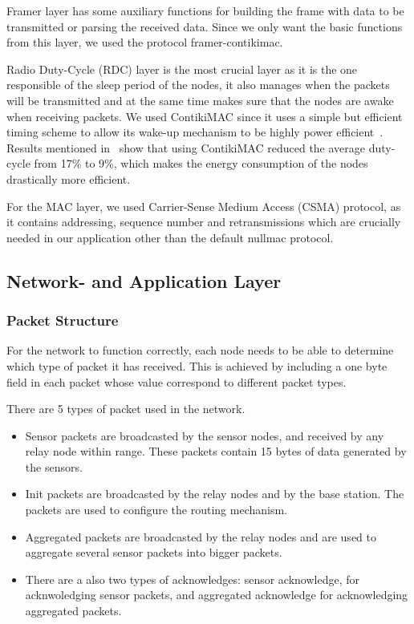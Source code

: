 \documentclass[conference]{IEEEtran}
\begin{document}
Framer layer has some auxiliary functions for building the frame with data to be transmitted or 
parsing the received data. Since we only want the basic functions from this layer, we used the 
protocol framer-contikimac.

Radio Duty-Cycle (RDC) layer is the most crucial layer as it is the one responsible of 
the sleep period of the nodes, it also manages when the packets will be transmitted 
and at the same time makes sure that the nodes are awake when receiving packets. 
We used ContikiMAC since it uses a simple but efficient timing scheme to allow its wake-up 
mechanism to be highly power efficient~\cite{ContikiDutyCycling}. Results mentioned in~\cite{ContikiMacProt} show that using 
ContikiMAC reduced the average duty-cycle from 17\% to 9\%, which makes the energy consumption 
of the nodes drastically more efficient.  

For the MAC layer, we used Carrier-Sense Medium Access (CSMA) protocol, as it contains 
addressing, sequence number and retransmissions which are crucially needed in our 
application other than the default nullmac protocol.

\subsection{Network- and Application Layer}

\subsubsection{Packet Structure}

For the network to function correctly, each node needs to be able to determine
which type of packet it has received. This is achieved by including a one
byte field in each packet whose value correspond to different packet types.

There are 5 types of packet used in the network.
\begin{itemize}
    \item Sensor packets are broadcasted by the sensor nodes, and received
    by any relay node within range. These packets contain 15 bytes of data
    generated by the sensors.
    \item Init packets are broadcasted by the relay nodes and by the base
    station. The packets are used to configure the routing mechanism.
    \item Aggregated packets are broadcasted by the relay nodes and are
    used to aggregate several sensor packets into bigger packets.
    \item There are a also two types of acknowledges: sensor acknowledge, for
    acknwoledging sensor packets, and aggregated acknowledge for acknowledging
    aggregated packets.
\end{itemize}
\end{document}
